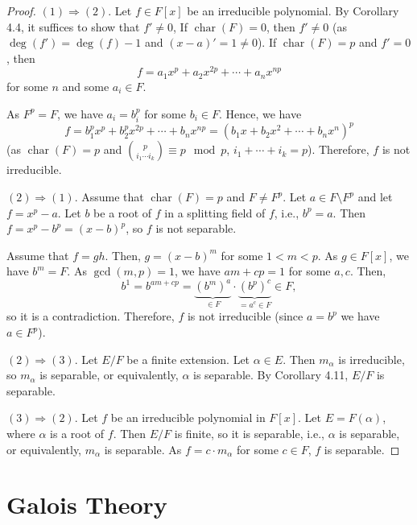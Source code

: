 \documentclass[twoside]{article}
\DeclareMathOperator\Char{char}
\theoremstyle{remark}
\begin{document}
\begin{proof}
  \((1) \Rightarrow (2)\). Let \(f \in F[x]\) be an irreducible polynomial. By Corollary 4.4, it suffices to show that \(f' \neq 0\), If \(\Char(F) = 0\), then \(f' \neq 0\) (as \(\deg(f') = \deg(f) - 1\) and \((x-a)' = 1 \neq 0\)). If \(\Char(F) = p\) and \(f' = 0\), then
  \[ f = a_1x^p + a_2x^{2p} + \cdots + a_nx^{np} \]
  for some \(n\) and some \(a_i \in F\).
  
  As \(F^p = F\), we have \(a_i = b_i^p\) for some \(b_i \in F\). Hence, we have
  \[ f = b_1^p x^p + b_2^p x^{2p} + \cdots + b_n x^{np} = (b_1x + b_2x^2 + \cdots + b_nx^n)^p \]
  (as \(\Char(F) = p\) and \(\binom p{i_1 \cdots i_k} \equiv p \mod p\), \(i_1 + \cdots + i_k = p\)). Therefore, \(f\) is not irreducible.
  
  \smallskip
  
  \((2) \Rightarrow (1)\). Assume that \(\Char(F) = p\) and \(F \neq F^p\). Let \(a \in F \setminus F^p\) and let \(f = x^p - a\). Let \(b\) be a root of \(f\) in a splitting field of \(f\), i.e., \(b^p = a\). Then \(f = x^p - b^p = (x-b)^p\), so \(f\) is not separable.
  
  Assume that \(f = gh\). Then, \(g = (x-b)^m\) for some \(1 < m < p\). As \(g \in F[x]\), we have \(b^m = F\). As \(\gcd(m,p) = 1\), we have \(am + cp = 1\) for some \(a,c\). Then,
  \[ b^1 = b^{am+cp} = \underbrace{(b^m)^a}_{\in F} \cdot \underbrace{(b^p)^c}_{= a^c \in F} \in F, \]
  so it is a contradiction. Therefore, \(f\) is not irreducible (since \(a = b^p\) we have \(a \in F^p\)).
  
  \smallskip
  
  \((2) \Rightarrow (3)\). Let \(E/F\) be a finite extension. Let \(\alpha \in E\). Then \(m_\alpha\) is irreducible, so \(m_\alpha\) is separable, or equivalently, \(\alpha\) is separable. By Corollary 4.11, \(E/F\) is separable.
  
  \smallskip
  
  \((3) \Rightarrow (2)\). Let \(f\) be an irreducible polynomial in \(F[x]\). Let \(E = F(\alpha)\), where \(\alpha\) is a root of \(f\). Then \(E/F\) is finite, so it is separable, i.e., \(\alpha\) is separable, or equivalently, \(m_\alpha\) is separable. As \(f = c \cdot m_\alpha\) for some \(c \in F\), \(f\) is separable.
\end{proof}


\clearpage

\part{Galois Theory}
\end{document}
